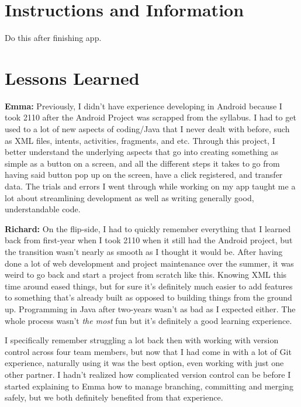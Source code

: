 \documentclass[12pt]{article}
\begin{document}
\maketitle

\section{Instructions and Information}
Do this after finishing app.

\section{Lessons Learned}
\textbf{Emma:} Previously, I didn't have experience developing in Android because I took 2110 after the Android Project was scrapped from the syllabus. I had to get used to a lot of new aspects of coding/Java that I never dealt with before, such as XML files, intents, activities, fragments, and etc. Through this project, I better understand the underlying aspects that go into creating something as simple as a button on a screen, and all the different steps it takes to go from having said button pop up on the screen, have a click registered, and transfer data. The trials and errors I went through while working on my app taught me a lot about streamlining development as well as writing generally good, understandable code.\break

\noindent \textbf{Richard:} On the flip-side, I had to quickly remember everything that I learned back from first-year when I took 2110 when it still had the Android project, but the transition wasn't nearly as smooth as I thought it would be. After having done a lot of web development and project maintenance over the summer, it was weird to go back and start a project from scratch like this. Knowing XML this time around eased things, but for sure it's definitely much easier to add features to something that's already built as opposed to building things from the ground up. Programming in Java after two-years wasn't as bad as I expected either. The whole process wasn't \textit{the most} fun but it's definitely a good learning experience.\break

\noindent I specifically remember struggling a lot back then with working with version control across four team members, but now that I had come in with a lot of Git experience, naturally using it was the best option, even working with just one other partner. I hadn't realized how complicated version control can be before I started explaining to Emma how to manage branching, committing and merging safely, but we both definitely benefited from that experience.
\end{document}
